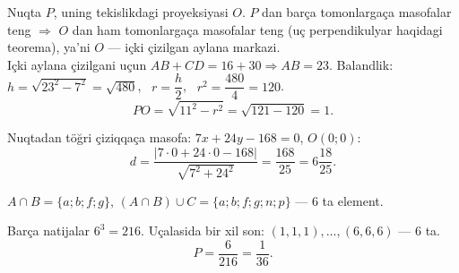 Nuqta $P$, uning tekislikdagi proyeksiyasi $O$. $P$ dan barça tomonlargaça masofalar teng $\Rightarrow$ $O$ dan ham tomonlargaça masofalar teng (uç perpendikulyar haqidagi teorema), ya'ni $O$ — içki çizilgan aylana markazi.\\
Içki aylana çizilgani uçun $AB+CD=16+30\Rightarrow AB=23$. Balandlik: $h=\sqrt{23^2-7^2}=\sqrt{480}$, \ $r=\dfrac h2$, \ $r^2=\dfrac{480}4=120$.
\[PO=\sqrt{11^2-r^2}=\sqrt{121-120}=1.\]

Nuqtadan töğri çiziqqaça masofa: $7x+24y-168=0$, $O(0;0)$:
\[d=\frac{|7\cdot0+24\cdot0-168|}{\sqrt{7^2+24^2}}=\frac{168}{25}=6\frac{18}{25}.\]

$A\cap B=\{a;b;f;g\}$, \quad $(A\cap B)\cup C=\{a;b;f;g;n;p\}$ — 6 ta element.

Barça natijalar $6^3=216$. Uçalasida bir xil son: $(1,1,1),\dots,(6,6,6)$ — 6 ta.
\[P=\frac6{216}=\frac1{36}.\]

